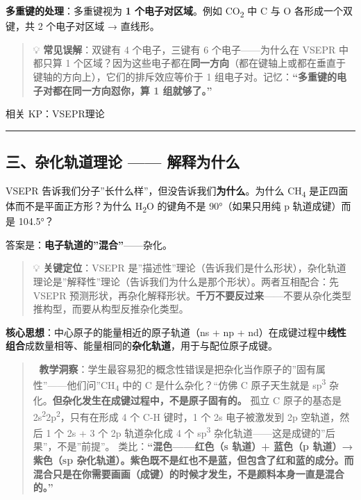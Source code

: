\documentclass[a4paper,11pt]{ctexart}
\begin{document}
\textbf{多重键的处理}：多重键视为 \textbf{1 个电子对区域}。例如 CO\textsubscript{2} 中 C 与 O 各形成一个双键，共 2 个电子对区域 → 直线形。

\begin{quote}
💡 \textbf{常见误解}：双键有 4 个电子，三键有 6 个电子------为什么在 VSEPR 中都只算 1 个区域？因为这些电子都在\textbf{同一方向}（都在键轴上或都在垂直于键轴的方向上），它们的排斥效应等价于 1 组电子对。记忆：\textbf{``多重键的电子对都在同一方向怼你，算 1 组就够了。''}
\end{quote}

相关 KP：VSEPR理论

\begin{center}\rule{0.5\linewidth}{0.5pt}\end{center}

\subsection{三、杂化轨道理论 ------ 解释为什么}\label{ux4e09ux6742ux5316ux8f68ux9053ux7406ux8bba-ux89e3ux91caux4e3aux4ec0ux4e48}

VSEPR 告诉我们分子''长什么样''，但没告诉我们\textbf{为什么}。为什么 CH\textsubscript{4} 是正四面体而不是平面正方形？为什么 H\textsubscript{2}O 的键角不是 90°（如果只用纯 p 轨道成键）而是 104.5°？

答案是：\textbf{电子轨道的''混合''}------杂化。

\begin{quote}
💡 \textbf{关键定位}：VSEPR 是''描述性''理论（告诉我们是什么形状），杂化轨道理论是''解释性''理论（告诉我们为什么是那个形状）。两者互相配合：先 VSEPR 预测形状，再杂化解释形状。\textbf{千万不要反过来}------不要从杂化类型推构型，而要从构型反推杂化类型。
\end{quote}

\textbf{核心思想}：中心原子的能量相近的原子轨道（ns + np + nd）在成键过程中\textbf{线性组合}成数量相等、能量相同的\textbf{杂化轨道}，用于与配位原子成键。

\begin{quote}
🧠 \textbf{教学洞察}：学生最容易犯的概念性错误是把杂化当作原子的''固有属性''------他们问''CH\textsubscript{4} 中的 C 是什么杂化？``仿佛 C 原子天生就是 sp\textsuperscript{3} 杂化。\textbf{但杂化发生在成键过程中，不是原子固有的。} 孤立 C 原子的基态是 2s\textsuperscript{2}2p\textsuperscript{2}，只有在形成 4 个 C-H 键时，1 个 2s 电子被激发到 2p 空轨道，然后 1 个 2s + 3 个 2p 轨道杂化成 4 个 sp\textsuperscript{3} 杂化轨道------这是成键的''后果''，不是''前提''。
类比：\textbf{``混色------红色（s 轨道）+ 蓝色（p 轨道）→ 紫色（sp 杂化轨道）。紫色既不是红也不是蓝，但包含了红和蓝的成分。而混合只是在你需要画画（成键）的时候才发生，不是颜料本身一直是混合的。''}
\end{quote}
\end{document}
